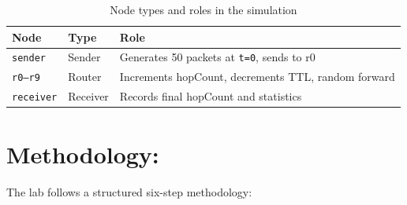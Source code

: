 \documentclass[12pt,a4paper]{article}
\begin{document}
\begin{table}[H]
\centering
\renewcommand{\arraystretch}{1.4}
\begin{tabular}{@{}lll@{}}
\toprule
\textbf{Node} & \textbf{Type} & \textbf{Role} \\
\midrule
\texttt{sender}   & Sender   & Generates 50 packets at \texttt{t=0}, sends to r0 \\
\texttt{r0--r9}   & Router   & Increments hopCount, decrements TTL, random forward \\
\texttt{receiver} & Receiver & Records final hopCount and statistics \\
\bottomrule
\end{tabular}
\caption{Node types and roles in the simulation}
\end{table}

\section{Methodology: }

\justifying
The lab follows a structured six-step methodology:
\end{document}
